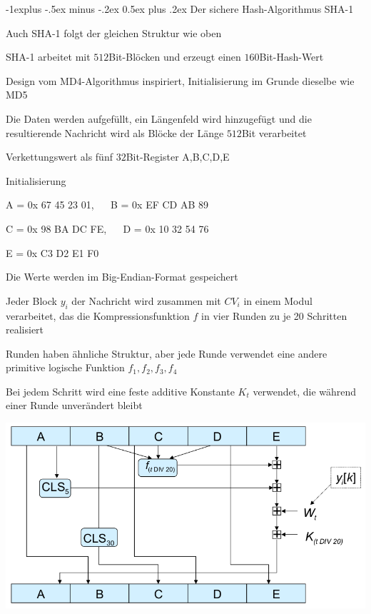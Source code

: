 \documentclass[a4paper]{article}
\makeatletter
\renewcommand{\subsection}{\@startsection{subsection}{2}{0mm}%
 {-1explus -.5ex minus -.2ex}%
 {0.5ex plus .2ex}%
 {\normalfont\normalsize\bfseries}}
\makeatother
\begin{document}
\begin{multicols}{3}
      \subsection{Der sichere Hash-Algorithmus SHA-1}
      \begin{itemize*}
            \item Auch SHA-1 folgt der gleichen Struktur wie oben
            \item SHA-1 arbeitet mit $512$Bit-Blöcken und erzeugt einen $160$Bit-Hash-Wert
            \item Design vom MD4-Algorithmus inspiriert, Initialisierung im Grunde dieselbe wie MD5
            \begin{itemize*}
                  \item Die Daten werden aufgefüllt, ein Längenfeld wird hinzugefügt und die resultierende Nachricht wird als Blöcke der Länge $512$Bit verarbeitet
                  \item Verkettungswert als fünf $32$Bit-Register A,B,C,D,E
                  \item Initialisierung
                  \begin{itemize*}
                        \item A = 0x 67 45 23 01, $\quad$ B = 0x EF CD AB 89
                        \item C = 0x 98 BA DC FE, $\quad$ D = 0x 10 32 54 76
                        \item E = 0x C3 D2 E1 F0
                  \end{itemize*}
                  \item Die Werte werden im Big-Endian-Format gespeichert
            \end{itemize*}
            \item Jeder Block $y_i$ der Nachricht wird zusammen mit $CV_i$ in einem Modul verarbeitet, das die Kompressionsfunktion $f$ in vier Runden zu je 20 Schritten realisiert
            \begin{itemize*}
                  \item Runden haben ähnliche Struktur, aber jede Runde verwendet eine andere primitive logische Funktion $f_1, f_2, f_3, f_4$
                  \item Bei jedem Schritt wird eine feste additive Konstante $K_t$ verwendet, die während einer Runde unverändert bleibt
            \end{itemize*}
            \item \includegraphics[width=.5\linewidth]{Assets/NetworkSecurity-sha1.png}

\end{itemize*}
\end{multicols}
\end{document}
